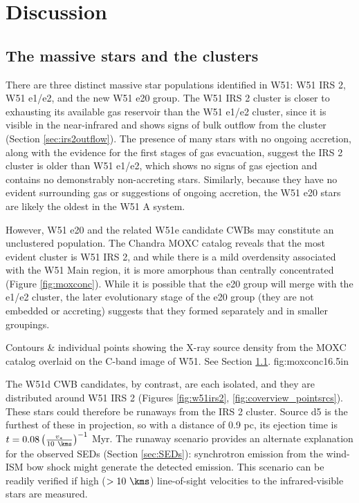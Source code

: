 \section{Discussion}
\label{sec:discussion}

\subsection{The massive stars and the clusters}
\label{sec:mstarscluster}
There are three distinct massive star populations identified in W51: W51 IRS 2,
W51 e1/e2, and the new W51 e20 group.  The W51 IRS 2 cluster is closer to
exhausting its available gas reservoir than the W51 e1/e2 cluster, since it is
visible in the near-infrared and shows signs of bulk outflow from the cluster
(Section \ref{sec:irs2outflow}).  The presence of many stars with no ongoing
accretion, along with the evidence for the first stages of gas evacuation,
suggest the IRS 2 cluster is older than W51 e1/e2, which shows no signs
of gas ejection and contains no demonstrably non-accreting stars.  Similarly,
because they have no evident surrounding gas or suggestions of ongoing
accretion, the W51 e20 stars are likely the oldest in the W51 A
system.

However, W51 e20 and the related W51e candidate CWBs may constitute an
unclustered population.  The Chandra MOXC catalog \citep{Townsley2014a} reveals
that the most evident cluster is W51 IRS 2, and while there is a mild
overdensity associated with the W51 Main region, it is more amorphous than
centrally concentrated (Figure \ref{fig:moxconc}).  While it is possible that
the e20 group will merge with the e1/e2 cluster, the later evolutionary stage
of the e20 group (they are not embedded or accreting) suggests that they formed
separately and in smaller groupings.

{Contours \& individual points showing the X-ray source density from the 
MOXC \citep{Townsley2014a} catalog overlaid on the C-band image of W51.
See Section \ref{sec:mstarscluster}.}
{fig:moxconc}{1}{6.5in}

The W51d CWB candidates, by contrast, are each isolated, and they are
distributed around W51 IRS 2 (Figures \ref{fig:w51irs2},
\ref{fig:coverview_pointsrcs}).  These stars could therefore be runaways from
the IRS 2 cluster.  Source d5 is the furthest of these in projection, so with a
distance of 0.9 pc, its ejection time is $t = 0.08 \left(\frac{v_*}{10
~\kms}\right)^{-1}$ Myr.  The runaway scenario provides an alternate
explanation for the observed SEDs (Section \ref{sec:SEDs}): synchrotron
emission from the wind-ISM bow shock might generate the detected emission.
This scenario can be readily verified if high ($>10~\kms$) line-of-sight
velocities to the infrared-visible stars are measured.


